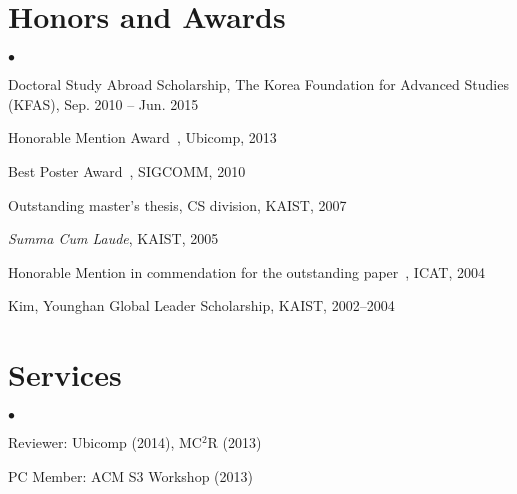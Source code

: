 \documentclass[margin,line]{res}
\newenvironment{list1}{
  \begin{list}{\ding{113}}{%
      \setlength{\itemsep}{0in}
      \setlength{\parsep}{0in} \setlength{\parskip}{0in}
      \setlength{\topsep}{0in} \setlength{\partopsep}{0in}
      \setlength{\leftmargin}{0.17in}}}{\end{list}}
\newenvironment{list2}{
  \begin{list}{$\bullet$}{%
      \setlength{\itemsep}{0in}
      \setlength{\parsep}{0in} \setlength{\parskip}{0in}
      \setlength{\topsep}{0in} \setlength{\partopsep}{0in}
      \setlength{\leftmargin}{0.2in}}}{\end{list}}
\begin{document}
\begin{resume}

\section{\sc Honors and Awards} 
\begin{list2}
\item{Doctoral Study Abroad Scholarship, The Korea Foundation for Advanced Studies (KFAS), Sep. 2010 -- Jun. 2015 }
\item{Honorable Mention Award~\cite{ubicomp13}, Ubicomp, 2013}
\item{Best Poster Award~\cite{sigcomm10}, SIGCOMM, 2010}
\item{Outstanding master's thesis, CS division, KAIST, 2007}
\item{\textit{Summa Cum Laude}, KAIST, 2005}
\item{Honorable Mention in commendation for the outstanding paper~\cite{icat04}, ICAT, 2004}
\item{Kim, Younghan Global Leader Scholarship, KAIST, 2002--2004}
\end{list2}





\section{\sc Services}
\begin{list2}
\item{Reviewer: Ubicomp (2014), MC$^2$R (2013)}
\item{PC Member: ACM S3 Workshop (2013)} 
\end{list2}



\end{resume}
\end{document}
